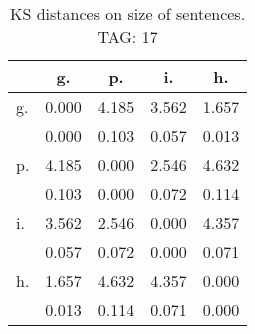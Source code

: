 \begin{table}[h!]
\begin{center}
\begin{tabular}{| l | c | c | c | c |}\hline
 & g. & p. & i. & h. \\\hline
g. & 0.000  & 4.185  & 3.562  & 1.657 \\\hline
 & 0.000  & 0.103  & 0.057  & 0.013 \\\hline
p. & 4.185  & 0.000  & 2.546  & 4.632 \\\hline
 & 0.103  & 0.000  & 0.072  & 0.114 \\\hline
i. & 3.562  & 2.546  & 0.000  & 4.357 \\\hline
 & 0.057  & 0.072  & 0.000  & 0.071 \\\hline
h. & 1.657  & 4.632  & 4.357  & 0.000 \\\hline
 & 0.013  & 0.114  & 0.071  & 0.000 \\\hline
\end{tabular}
\caption{KS distances on size of sentences. TAG: 17}
\end{center}
\end{table}